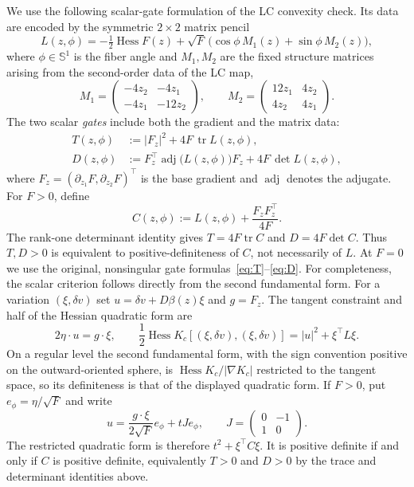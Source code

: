 \documentclass[11pt,reqno]{amsart}
\theoremstyle{plain}
\theoremstyle{definition}
\DeclareMathOperator{\tr}{tr}
\DeclareMathOperator{\adj}{adj}
\DeclareMathOperator{\Hess}{Hess}
\newcommand{\Sph}{\mathbb{S}}
\newcommand{\Fz}{F_{z}}
\begin{document}
We use the following scalar-gate formulation of the LC convexity check. Its data are encoded by the symmetric $2\times2$ matrix pencil
\begin{equation}\label{eq:L}
L(z,\phi)=-\tfrac12\Hess F(z)+\sqrt{F}\,\bigl(\cos\phi\,M_1(z)+\sin\phi\,M_2(z)\bigr),
\end{equation}
where $\phi\in\Sph^1$ is the fiber angle and $M_1,M_2$ are the fixed structure matrices arising from the second-order data of the LC map,
\begin{equation}\label{eq:M}
M_1=\begin{pmatrix}-4z_2&-4z_1\\-4z_1&-12z_2\end{pmatrix},
\qquad
M_2=\begin{pmatrix}12z_1&4z_2\\4z_2&4z_1\end{pmatrix}.
\end{equation}
The two scalar \emph{gates} include both the gradient and the matrix data:
\begin{align}
T(z,\phi)&:=|\Fz|^2+4F\,\tr L(z,\phi),\label{eq:T}\\
D(z,\phi)&:=\Fz^{\!\top}\adj\!\bigl(L(z,\phi)\bigr)\Fz+4F\,\det L(z,\phi),\label{eq:D}
\end{align}
where $\Fz=(\partial_{z_1}F,\partial_{z_2}F)^\top$ is the base gradient and $\adj$ denotes the adjugate. For $F>0$, define
\[
C(z,\phi):=L(z,\phi)+\frac{\Fz\Fz^{\!\top}}{4F}.
\]
The rank-one determinant identity gives $T=4F\tr C$ and $D=4F\det C$. Thus $T,D>0$ is equivalent to positive-definiteness of $C$, not necessarily of $L$. At $F=0$ we use the original, nonsingular gate formulas~\eqref{eq:T}--\eqref{eq:D}. For completeness, the scalar criterion follows directly from the second
fundamental form.  For a variation $(\xi,\delta v)$ set
$u=\delta v+D\beta(z)\xi$ and $g=F_z$.
The tangent constraint and half of the Hessian quadratic form are
\[
 2\eta\cdot u=g\cdot\xi,
 \qquad
 \frac12\operatorname{Hess}K_c[(\xi,\delta v),(
 \xi,\delta v)]=|u|^2+\xi^\top L\xi.
\]
On a regular level the second fundamental form, with the sign convention
positive on the outward-oriented sphere, is
$\operatorname{Hess}K_c/|\nabla K_c|$ restricted to the tangent space,
so its definiteness is that of the displayed quadratic form.
If $F>0$, put $e_\phi=\eta/\sqrt F$ and write
\[
 u=\frac{g\cdot\xi}{2\sqrt F}e_\phi+tJe_\phi,
 \qquad
 J=\begin{pmatrix}0&-1\\1&0\end{pmatrix}.
\]
The restricted quadratic form is therefore
$t^2+\xi^\top C\xi$.  It is positive definite if and only if
$C$ is positive definite, equivalently $T>0$ and $D>0$ by the
trace and determinant identities above.
\end{document}

